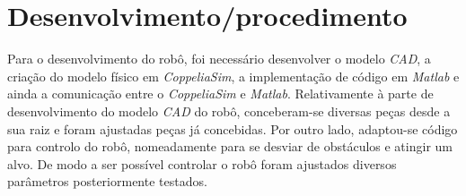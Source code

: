 \chapter{Desenvolvimento/procedimento}
\label{ch:desenvolvimento}

Para o desenvolvimento do robô, foi necessário desenvolver o modelo \textit{CAD}, a criação do modelo físico em \textit{CoppeliaSim}, a implementação de código em \textit{Matlab} e ainda a comunicação entre o \textit{CoppeliaSim} e \textit{Matlab}. Relativamente à parte de desenvolvimento do modelo \textit{CAD} do robô, conceberam-se diversas peças desde a sua raiz e foram ajustadas peças já concebidas. Por outro lado, adaptou-se código para controlo do robô, nomeadamente para se desviar de obstáculos e atingir um alvo. De modo a ser possível controlar o robô foram ajustados diversos parâmetros posteriormente testados.
%
%
%


